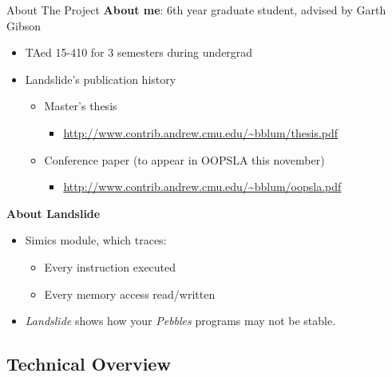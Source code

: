 \documentclass[xcolor=dvipsnames]{beamer}
\begin{document}
\begin{frame}{About The Project}
	\textbf{About me}: 6th year graduate student, advised by Garth Gibson
	\begin{itemize}
		\item TAed 15-410 for 3 semesters during undergrad
		\item Landslide's publication history
		\begin{itemize}
			\item Master's thesis
			\begin{itemize}
				\item \url{http://www.contrib.andrew.cmu.edu/~bblum/thesis.pdf}
			\end{itemize}
			\item Conference paper (to appear in OOPSLA this november)
			\begin{itemize}
				\item \url{http://www.contrib.andrew.cmu.edu/~bblum/oopsla.pdf}
			\end{itemize}
		\end{itemize}
	\end{itemize}
	\pause
	\linegap

	{\bf About Landslide}
	\begin{itemize}
		\item Simics module, which traces:
			\begin{itemize}
				\item Every instruction executed
				\item Every memory access read/written
			\end{itemize}
		\item {\em Landslide} shows how your {\em Pebbles} programs may not be stable.
	\end{itemize}
\end{frame}


\subsection{Technical Overview}
\end{document}
